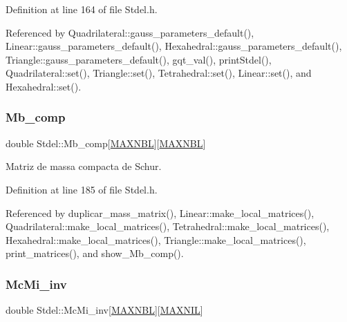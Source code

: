 Definition at line 164 of file Stdel.\+h.



Referenced by Quadrilateral\+::gauss\+\_\+parameters\+\_\+default(), Linear\+::gauss\+\_\+parameters\+\_\+default(), Hexahedral\+::gauss\+\_\+parameters\+\_\+default(), Triangle\+::gauss\+\_\+parameters\+\_\+default(), gqt\+\_\+val(), print\+Stdel(), Quadrilateral\+::set(), Triangle\+::set(), Tetrahedral\+::set(), Linear\+::set(), and Hexahedral\+::set().

\mbox{\label{classStdel_aa1627cb39fa5da75764809412159c825}} 
\subsubsection{\texorpdfstring{Mb\+\_\+comp}{Mb\_comp}}
{\footnotesize\ttfamily double Stdel\+::\+Mb\+\_\+comp\mbox{[}\hyperlink{MyOptions_8h_aed8828a63ec0a2a0461b7c9ed39dd648}{M\+A\+X\+N\+BL}\mbox{]}\mbox{[}\hyperlink{MyOptions_8h_aed8828a63ec0a2a0461b7c9ed39dd648}{M\+A\+X\+N\+BL}\mbox{]}\hspace{0.3cm}{\ttfamily [protected]}}



Matriz de massa compacta de Schur. 



Definition at line 185 of file Stdel.\+h.



Referenced by duplicar\+\_\+mass\+\_\+matrix(), Linear\+::make\+\_\+local\+\_\+matrices(), Quadrilateral\+::make\+\_\+local\+\_\+matrices(), Tetrahedral\+::make\+\_\+local\+\_\+matrices(), Hexahedral\+::make\+\_\+local\+\_\+matrices(), Triangle\+::make\+\_\+local\+\_\+matrices(), print\+\_\+matrices(), and show\+\_\+\+Mb\+\_\+comp().

\mbox{\label{classStdel_acc685141e80bcce9703e37f32cc5c42c}} 
\subsubsection{\texorpdfstring{Mc\+Mi\+\_\+inv}{McMi\_inv}}
{\footnotesize\ttfamily double Stdel\+::\+Mc\+Mi\+\_\+inv\mbox{[}\hyperlink{MyOptions_8h_aed8828a63ec0a2a0461b7c9ed39dd648}{M\+A\+X\+N\+BL}\mbox{]}\mbox{[}\hyperlink{MyOptions_8h_a463cdf068fb6289d1f81dac7e0f76ab5}{M\+A\+X\+N\+IL}\mbox{]}\hspace{0.3cm}{\ttfamily [protected]}}



